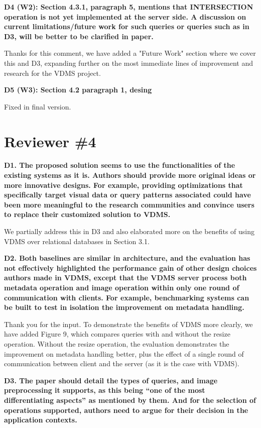 \documentclass[11pt]{proposalnsf}
\begin{document}
\bigskip
\textbf{
D4 (W2): Section 4.3.1, paragraph 5, mentions that INTERSECTION operation is not
yet implemented at the server side.
A discussion on current limitations/future work for such queries or queries
such as in D3, will be better to be clarified in paper.
}\bigskip

Thanks for this comment, we have added a "Future Work" section where we cover
this and D3, expanding further on the most immediate lines of
improvement and research for the VDMS project.

\bigskip
\textbf{
D5 (W3): Section 4.2 paragraph 1, desing
}\bigskip

Fixed in final version.

\bigskip

\newpage
\section{Reviewer \#4}

\bigskip
\textbf{
D1. The proposed solution seems to use the functionalities of the existing systems
as it is. Authors should provide more original ideas or more innovative designs.
For example, providing optimizations that specifically target visual data or query
patterns associated could have been more meaningful to the research communities and
convince users to replace their customized solution to VDMS.
}\bigskip

We partially address this in D3 and also elaborated more on the benefits of
using VDMS over relational databases in Section 3.1.

\bigskip
\textbf{
D2. Both baselines are similar in architecture, and the evaluation has not effectively
highlighted the performance gain of other design choices authors made in VDMS,
except that the VDMS server process both metadata operation and image operation
within only one round of communication with clients.
For example, benchmarking systems can be built to test in isolation the
improvement on metadata handling.
}\bigskip

Thank you for the input. To demonstrate the benefits of VDMS more clearly,
we have added Figure 9, which compares queries with and without the resize operation.
Without the resize operation, the evaluation demonstrates the
improvement on metadata handling better, plus the effect of a single round
of communication between client and the server (as it is the case with VDMS).

\bigskip
\textbf{
D3. The paper should detail the types of queries, and image preprocessing it supports,
as this being “one of the most differentiating aspects” as mentioned by them.
And for the selection of operations supported, authors need to argue for their
decision in the application contexts.
}\bigskip
\end{document}
